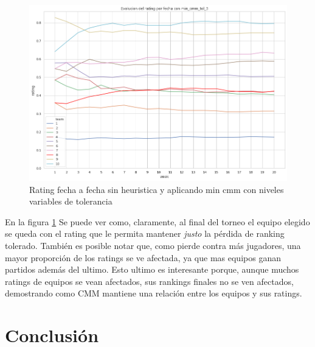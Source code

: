 \documentclass[a4paper]{article}
\begin{document}
\begin{figure}[H]
\begin{center}
        \includegraphics[scale=0.25]{img/heur/evol-min-cmm-tol-3.png}
        \caption{Rating fecha a fecha sin heuristica y aplicando min cmm con niveles variables de tolerancia}
        \label{heur-evol-cmm}
    \end{center}
\end{figure}

En la figura \ref{heur-evol-cmm} Se puede ver como, claramente, al final del torneo el equipo elegido se queda con el rating que le permita mantener \textit{justo} la pérdida de ranking tolerado. También es posible notar que, como pierde contra más jugadores, una mayor proporción de los ratings se ve afectada, ya que mas equipos ganan partidos además del ultimo. Esto ultimo es interesante porque, aunque muchos ratings de equipos se vean afectados, sus rankings finales no se ven afectados, demostrando como CMM mantiene una relación entre los equipos y sus ratings.

\section{Conclusión}
\end{document}
